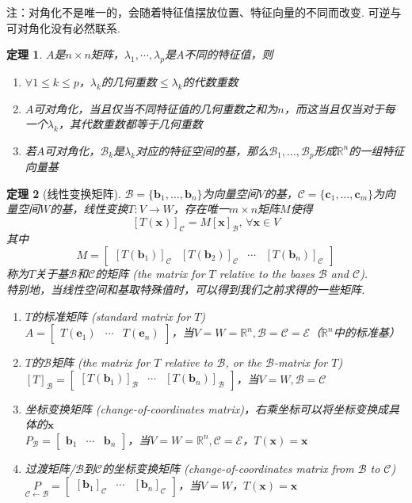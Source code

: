 \documentclass[11pt,UTF8]{ctexart}
\newtheorem{theorem}{定理}
\def\vx{\mathbf{x}}
\def\rn{\mathbb{R}^n}
\newcommand{\vb}[1]{\mathbf{#1}}
\newcommand{\bmat}[2]{\begin{bmatrix}{#1}&\cdots&{#2}\end{bmatrix}}
\begin{document}
注：对角化不是唯一的，会随着特征值摆放位置、特征向量的不同而改变. 可逆与可对角化没有必然联系.
\begin{theorem}
$A$是$n\times n$矩阵，$\lambda_1,\cdots,\lambda_p$是$A$不同的特征值，则
\begin{enumerate}
	\itemsep -3pt
	\item $\forall 1\leq k\leq p$，$\lambda_k$的几何重数$\leq\lambda_k$的代数重数
	\item $A$可对角化，当且仅当不同特征值的几何重数之和为$n$，而这当且仅当对于每一个$\lambda_k$，其代数重数都等于几何重数
	\item 若$A$可对角化，$\mathcal{B}_k$是$\lambda_k$对应的特征空间的基，那么$\mathcal{B}_1,\dots,\mathcal{B}_p$形成$\rn$的一组特征向量基
\end{enumerate}
\end{theorem}
\begin{theorem}[线性变换矩阵]
\label{linear_trans_tot}
$\mathcal{B}=\{\vb{b}_1,\dots,\vb{b}_n\}$为向量空间$V$的基，$\mathcal{C}=\{\vb{c}_1,\dots,\vb{c}_m\}$为向量空间$W$的基，线性变换$T:V\to W$，存在唯一$m\times n$矩阵$M$使得
\[[T(\vx)]_\mathcal{C}=M[\vx]_\mathcal{B},\,\forall\vx\in V\]
其中
\[M=\begin{bmatrix}[T(\mathbf{b}_1)]_\mathcal{C}&[T(\mathbf{b}_2)]_\mathcal{C}&\cdots&[T(\mathbf{b}_n)]_\mathcal{C}\end{bmatrix}\]
称为$T$关于基$\mathcal{B}$和$\mathcal{C}$的矩阵 (the matrix for $T$ relative to the bases $\mathcal{B}$ and $\mathcal{C}$).\\
特别地，当线性空间和基取特殊值时，可以得到我们之前求得的一些矩阵.
\begin{enumerate}
	\itemsep -1pt
	\item $T$的标准矩阵 (standard matrix for $T$)\\
	$A=\bmat{T(\vb{e}_1)}{T(\vb{e}_n)}$，当$V=W=\rn,\mathcal{B}=\mathcal{C}=\mathcal{E}$（$\rn$中的标准基）
	\item $T$的$\mathcal{B}$矩阵 (the matrix for $T$ relative to $\mathcal{B}$, or the $\mathcal{B}$-matrix for $T$)\\
	$[T]_{\mathcal{B}}=\bmat{[T(\mathbf{b}_1)]_\mathcal{B}}{[T(\mathbf{b}_n)]_\mathcal{B}}$，当$V=W,\mathcal{B}=\mathcal{C}$
	\item 坐标变换矩阵 (change-of-coordinates matrix)，右乘坐标可以将坐标变换成具体的$\vx$\\
	$P_\mathcal{B}=\bmat{\vb{b}_1}{\vb{b}_n}$，当$V=W=\rn,\mathcal{C}=\mathcal{E}$，$T(\vx)=\vx$
	\item 过渡矩阵/$\mathcal{B}$到$\mathcal{C}$的坐标变换矩阵 (change-of-coordinates matrix from $\mathcal{B}$ to $\mathcal{C}$)\\
	$\underset{\mathcal{C}\gets \mathcal{B}}{P}=\bmat{[\vb{b}_1]_{\mathcal{C}}}{[\vb{b}_n]_{\mathcal{C}}}$，当$V=W$，$T(\vx)=\vx$
\end{enumerate}
\end{theorem}
\end{document}
